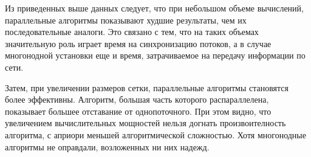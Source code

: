 Из приведенных выше данных следует, что при небольшом объеме вычислений, параллельные алгоритмы показывают худшие результаты, чем их последовательные аналоги.
Это связано с тем, что на таких объемах значительную роль играет время на синхронизацию потоков, а в случае многонодной установки еще и время, затрачиваемое на передачу информации по сети.

Затем, при увеличении размеров сетки, параллельные алгоритмы становятся более эффективны. Алгоритм, большая часть которого распараллелена, показывает большее отставание от однопоточного. При этом видно, что увеличением вычислительных мощностей нельзя догнать произвоителность алгоритма, с априори меньшей алгоритмической сложностью. Хотя многонодные алгоритмы не оправдали, возложенных ни них надежд.